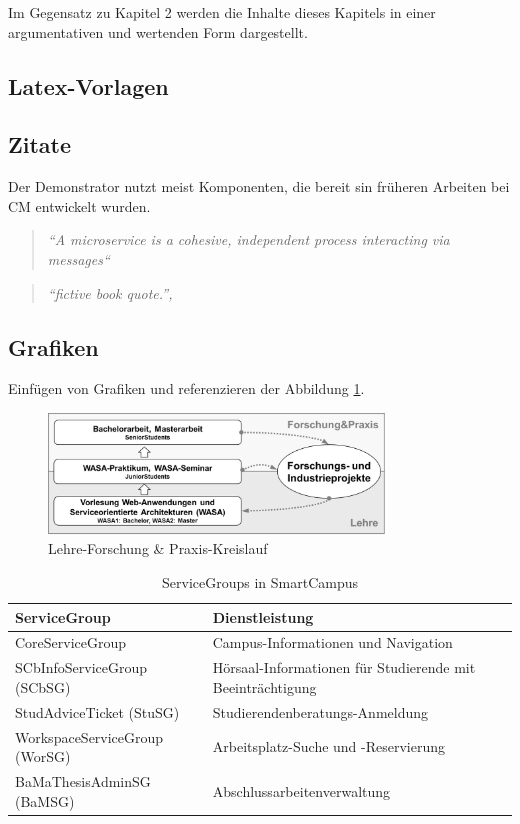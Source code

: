 Im Gegensatz zu Kapitel 2 werden die Inhalte dieses Kapitels in einer argumentativen und wertenden Form dargestellt.

\iffalse
\subsection{Latex-Vorlagen}

\subsection{Zitate}
\label{subsec:zitate}
Der Demonstrator nutzt meist Komponenten, die bereit sin früheren Arbeiten bei \gls{CM} entwickelt wurden.
\begin{quote}
\textit{``A microservice is a cohesive, independent process interacting via messages``}
\end{quote}
\begin{quote}
\textit{``fictive book quote.'', \cite[S.~99]{Be02}}
\end{quote}

\subsection{Grafiken}
Einfügen von Grafiken und referenzieren der Abbildung \ref{fig:lehre}.
\begin{figure}[h]
	\centering
	\includegraphics[width=0.8\textwidth]{images/lehre_kreislauf.png}
	\caption{Lehre-Forschung \& Praxis-Kreislauf}
	\label{fig:lehre}
\end{figure}

\begin{table}
	\centering
	\begin{tabular}{ | l | p{7cm} | }
		\hline
		ServiceGroup & Dienstleistung \\
		\hline
		 CoreServiceGroup & Campus-Informationen und Navigation \\
	 	\hline
	 	SCbInfoServiceGroup (SCbSG) & Hörsaal-Informationen für Studierende mit Beeinträchtigung \\
	 	\hline
	 	 StudAdviceTicket (StuSG) & Studierendenberatungs-Anmeldung \\
	 	\hline
	 	WorkspaceServiceGroup (WorSG) & Arbeitsplatz-Suche und -Reservierung \\
	 	\hline
	 	BaMaThesisAdminSG (BaMSG) & Abschlussarbeitenverwaltung \\
	 	\hline
	\end{tabular}
	\caption{ServiceGroups in SmartCampus}
	\label{tab:smartcampus-servicegroups}
\end{table}

